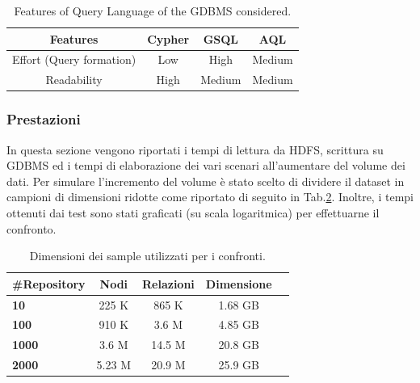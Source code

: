 \documentclass[11pt]{article}
\begin{document}
\begin{table}[!ht]
\centering
\begin{tabular}{cccc}
\toprule
Features & Cypher & GSQL & AQL \\
\midrule
Effort (Query formation) & Low & High & Medium \\
Readability & High & Medium & Medium \\
\bottomrule
\end{tabular}
\caption{Features of Query Language of the GDBMS considered.}
\label{tab:query_langugaes}
\end{table}
%

\newpage
\subsubsection{Prestazioni}
In questa sezione vengono riportati i tempi di lettura da HDFS, scrittura su GDBMS ed i tempi di elaborazione dei vari scenari all'aumentare del volume dei dati. Per simulare l'incremento del volume è stato scelto di dividere il dataset in campioni di dimensioni ridotte come riportato di seguito in Tab.\ref{tab:sample_dim}. Inoltre, i tempi ottenuti dai test sono stati graficati (su scala logaritmica) per effettuarne il confronto.

\begin{table}[h]
    \centering
    \begin{tabular}{lcccc}
    \toprule
    \textbf{\#Repository} & \textbf{Nodi} & \textbf{Relazioni} & \textbf{Dimensione} \\
    \midrule
        \textbf{10} & 225 K  & 865 K  & 1.68 GB \\
        \textbf{100}  & 910 K  & 3.6 M  & 4.85 GB \\
        \textbf{1000} & 3.6 M  & 14.5 M & 20.8 GB \\
        \textbf{2000} & 5.23 M & 20.9 M & 25.9 GB \\
    \bottomrule
    \end{tabular}
    \caption{Dimensioni dei sample utilizzati per i confronti.}
    \label{tab:sample_dim}
\end{table}
\end{document}
